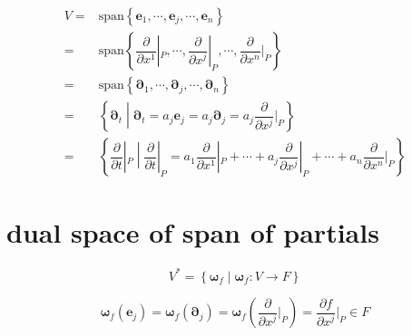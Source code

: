 \documentclass[
]{book}
\theoremstyle{definition}
\theoremstyle{definition}
\theoremstyle{definition}
\theoremstyle{definition}
\theoremstyle{remark}
\begin{document}
\[
\begin{aligned}
V= & \mathrm{span}\left\{ \boldsymbol{e}_{{\scriptscriptstyle 1}},\cdots,\boldsymbol{e}_{{\scriptscriptstyle j}},\cdots,\boldsymbol{e}_{{\scriptscriptstyle n}}\right\} \\
= & \mathrm{span}\left\{ \dfrac{\partial}{\partial x^{{\scriptscriptstyle 1}}}|_{{\scriptscriptstyle P}},\cdots,\dfrac{\partial}{\partial x^{{\scriptscriptstyle j}}}|_{{\scriptscriptstyle P}},\cdots,\dfrac{\partial}{\partial x^{{\scriptscriptstyle n}}}|_{{\scriptscriptstyle P}}\right\} \\
= & \mathrm{span}\left\{ \boldsymbol{\partial}_{{\scriptscriptstyle 1}},\cdots,\boldsymbol{\partial}_{{\scriptscriptstyle j}},\cdots,\boldsymbol{\partial}_{{\scriptscriptstyle n}}\right\} \\
= & \left\{ \boldsymbol{\partial}_{{\scriptscriptstyle t}}\middle|\boldsymbol{\partial}_{{\scriptscriptstyle t}}=a_{{\scriptscriptstyle j}}\boldsymbol{e}_{{\scriptscriptstyle j}}=a_{{\scriptscriptstyle j}}\boldsymbol{\partial}_{{\scriptscriptstyle j}}=a_{{\scriptscriptstyle j}}\dfrac{\partial}{\partial x^{{\scriptscriptstyle j}}}|_{{\scriptscriptstyle P}}\right\} \\
= & \left\{ \dfrac{\partial}{\partial t}|_{{\scriptscriptstyle P}}\middle|\dfrac{\partial}{\partial t}|_{{\scriptscriptstyle P}}=a_{{\scriptscriptstyle 1}}\dfrac{\partial}{\partial x^{{\scriptscriptstyle 1}}}|_{{\scriptscriptstyle P}}+\cdots+a_{{\scriptscriptstyle j}}\dfrac{\partial}{\partial x^{{\scriptscriptstyle j}}}|_{{\scriptscriptstyle P}}+\cdots+a_{{\scriptscriptstyle n}}\dfrac{\partial}{\partial x^{{\scriptscriptstyle n}}}|_{{\scriptscriptstyle P}}\right\} 
\end{aligned}
\]

\section{dual space of span of partials}\label{dual-space-of-span-of-partials}

\[
V^{*}=\left\{ \boldsymbol{\omega}_{{\scriptscriptstyle f}}\middle|\boldsymbol{\omega}_{{\scriptscriptstyle f}}:V\rightarrow F\right\} 
\]

\[
\boldsymbol{\omega}_{{\scriptscriptstyle f}}\left(\boldsymbol{e}_{{\scriptscriptstyle j}}\right)=\boldsymbol{\omega}_{{\scriptscriptstyle f}}\left(\boldsymbol{\partial}_{{\scriptscriptstyle j}}\right)=\boldsymbol{\omega}_{{\scriptscriptstyle f}}\left(\dfrac{\partial}{\partial x^{{\scriptscriptstyle j}}}|_{{\scriptscriptstyle P}}\right)=\dfrac{\partial f}{\partial x^{{\scriptscriptstyle j}}}|_{{\scriptscriptstyle P}}\in F
\]
\end{document}
